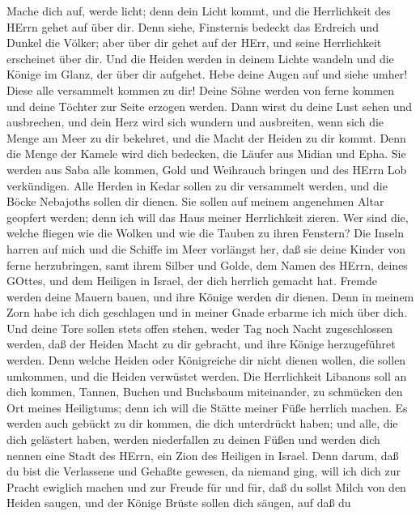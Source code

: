  Mache dich auf, werde licht; denn dein Licht kommt, und die
Herrlichkeit des HErrn gehet auf über dir.  Denn siehe,
Finsternis bedeckt das Erdreich und Dunkel die Völker; aber über dir
gehet auf der HErr, und seine Herrlichkeit erscheinet über dir.
 Und die Heiden werden in deinem Lichte wandeln und die
Könige im Glanz, der über dir aufgehet.  Hebe deine Augen
auf und siehe umher! Diese alle versammelt kommen zu dir! Deine Söhne
werden von ferne kommen und deine Töchter zur Seite erzogen werden.
 Dann wirst du deine Lust sehen und ausbrechen, und dein
Herz wird sich wundern und ausbreiten, wenn sich die Menge am Meer zu
dir bekehret, und die Macht der Heiden zu dir kommt.  Denn
die Menge der Kamele wird dich bedecken, die Läufer aus Midian und Epha.
Sie werden aus Saba alle kommen, Gold und Weihrauch bringen und des
HErrn Lob verkündigen.  Alle Herden in Kedar sollen zu dir
versammelt werden, und die Böcke Nebajoths sollen dir dienen. Sie sollen
auf meinem angenehmen Altar geopfert werden; denn ich will das Haus
meiner Herrlichkeit zieren.  Wer sind die, welche fliegen
wie die Wolken und wie die Tauben zu ihren Fenstern?  Die
Inseln harren auf mich und die Schiffe im Meer vorlängst her, daß sie
deine Kinder von ferne herzubringen, samt ihrem Silber und Golde, dem
Namen des HErrn, deines GOttes, und dem Heiligen in Israel, der dich
herrlich gemacht hat.  Fremde werden deine Mauern bauen,
und ihre Könige werden dir dienen. Denn in meinem Zorn habe ich dich
geschlagen und in meiner Gnade erbarme ich mich über dich. 
Und deine Tore sollen stets offen stehen, weder Tag noch Nacht
zugeschlossen werden, daß der Heiden Macht zu dir gebracht, und ihre
Könige herzugeführet werden.  Denn welche Heiden oder
Königreiche dir nicht dienen wollen, die sollen umkommen, und die Heiden
verwüstet werden.  Die Herrlichkeit Libanons soll an dich
kommen, Tannen, Buchen und Buchsbaum miteinander, zu schmücken den Ort
meines Heiligtums; denn ich will die Stätte meiner Füße herrlich machen.
 Es werden auch gebückt zu dir kommen, die dich unterdrückt
haben; und alle, die dich gelästert haben, werden niederfallen zu deinen
Füßen und werden dich nennen eine Stadt des HErrn, ein Zion des Heiligen
in Israel.  Denn darum, daß du bist die Verlassene und
Gehaßte gewesen, da niemand ging, will ich dich zur Pracht ewiglich
machen und zur Freude für und für,  daß du sollst Milch von
den Heiden saugen, und der Könige Brüste sollen dich säugen, auf daß du
